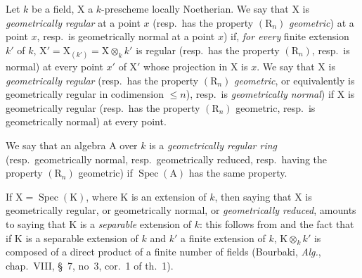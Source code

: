 \begin{definition}[6.7.6]
\label{IV.6.7.6}
Let $k$ be a field, $\mathrm{X}$ a $k$-prescheme locally Noetherian. We say that $\mathrm{X}$ is \emph{geometrically regular} at a point $x$ (resp.\ has the property $(\mathrm{R}_n)$ \emph{geometric}) at a point $x$, resp.\ is geometrically normal at a point $x$) if, \emph{for every} finite extension $k'$ of $k$, $\mathrm{X}'=\mathrm{X}_{(k')}=\mathrm{X}\otimes_k k'$ is regular (resp.\ has the property $(\mathrm{R}_n)$, resp.\ is normal) at every point $x'$ of $\mathrm{X}'$ whose projection in $\mathrm{X}$ is $x$. We say that $\mathrm{X}$ is \emph{geometrically regular} (resp.\ has the property $(\mathrm{R}_n)$ \emph{geometric}, or equivalently is geometrically regular in codimension $\leqslant n$), resp.\ is \emph{geometrically normal}) if $\mathrm{X}$ is geometrically regular (resp.\ has the property $(\mathrm{R}_n)$ geometric, resp.\ is geometrically normal) at every point.

We say that an algebra $\mathrm{A}$ over $k$ is a \emph{geometrically regular ring} (resp.\ geometrically normal, resp.\ geometrically reduced, resp.\ having the property $(\mathrm{R}_n)$ geometric) if $\operatorname{Spec}(\mathrm{A})$ has the same property.

If $\mathrm{X}=\operatorname{Spec}(\mathrm{K})$, where $\mathrm{K}$ is an extension of $k$, then saying that $\mathrm{X}$ is geometrically regular, or geometrically normal, or \emph{geometrically reduced}, amounts to saying that $\mathrm{K}$ is a \emph{separable} extension of $k$: this follows from  and the fact that if $\mathrm{K}$ is a separable extension of $k$ and $k'$ a finite extension of $k$, $\mathrm{K}\otimes_k k'$ is composed of a direct product of a finite number of fields (Bourbaki, \emph{Alg.}, chap.~VIII, \S~7, no~3, cor.~1 of th.~1).
\end{definition}


